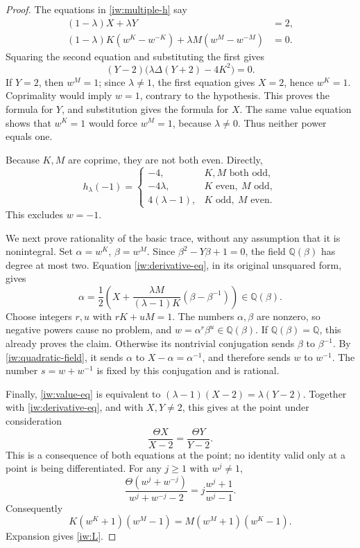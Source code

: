 \documentclass[11pt,a4paper]{article}
\theoremstyle{definition}
\theoremstyle{remark}
\begin{document}
\begin{proof}
The equations in \eqref{iw:multiple-h} say
\begin{align}
 (1-\lambda)X+\lambda Y&=2,\label{iw:value-eq}\\
 (1-\lambda)K(w^K-w^{-K})
   +\lambda M(w^M-w^{-M})&=0.\label{iw:derivative-eq}
\end{align}
Squaring the second equation and substituting the first gives
\[
 (Y-2)\bigl(\lambda\Delta(Y+2)-4K^2\bigr)=0.
 \tag{\(\ast\)}
\]
If \(Y=2\), then \(w^M=1\); since \(\lambda\ne1\), the first
equation gives \(X=2\), hence \(w^K=1\). Coprimality would imply
\(w=1\), contrary to the hypothesis. This proves the formula for
\(Y\), and substitution gives the formula for \(X\).
The same value equation shows that \(w^K=1\) would force
\(w^M=1\), because \(\lambda\ne0\). Thus neither power equals one.

Because \(K,M\) are coprime, they are not both even. Directly,
\[
 h_\lambda(-1)=
 \begin{cases}
  -4,&K,M\text{ both odd},\\
  -4\lambda,&K\text{ even},\ M\text{ odd},\\
  4(\lambda-1),&K\text{ odd},\ M\text{ even}.
 \end{cases}
\]
This excludes \(w=-1\).

We next prove rationality of the basic trace, without any
assumption that it is nonintegral. Set
\(\alpha=w^K\), \(\beta=w^M\). Since
\(\beta^2-Y\beta+1=0\), the field \(\mathbb Q(\beta)\) has degree
at most two. Equation \eqref{iw:derivative-eq}, in its original
unsquared form, gives
\begin{equation}\label{iw:quadratic-field}
 \alpha=\frac12\left(
 X+\frac{\lambda M}{(\lambda-1)K}
       (\beta-\beta^{-1})\right)\in\mathbb Q(\beta).
\end{equation}
Choose integers \(r,u\) with \(rK+uM=1\). The numbers \(\alpha,\beta\)
are nonzero, so negative powers cause no problem, and
\(w=\alpha^r\beta^u\in\mathbb Q(\beta)\).
If \(\mathbb Q(\beta)=\mathbb Q\), this already proves the claim.
Otherwise its nontrivial conjugation sends \(\beta\) to
\(\beta^{-1}\). By \eqref{iw:quadratic-field}, it sends \(\alpha\)
to \(X-\alpha=\alpha^{-1}\), and therefore sends \(w\) to \(w^{-1}\).
The number \(s=w+w^{-1}\) is fixed by this conjugation and is rational.

Finally, \eqref{iw:value-eq} is equivalent to
\((\lambda-1)(X-2)=\lambda(Y-2)\).
Together with \eqref{iw:derivative-eq}, and with \(X,Y\ne2\),
this gives at the point under consideration
\[
 \frac{\Theta X}{X-2}=\frac{\Theta Y}{Y-2}.
\]
This is a consequence of both equations at the point; no identity
valid only at a point is being differentiated. For any \(j\ge1\)
with \(w^j\ne1\),
\[
 \frac{\Theta(w^j+w^{-j})}{w^j+w^{-j}-2}
 =j\frac{w^j+1}{w^j-1}.
\]
Consequently
\[
 K(w^K+1)(w^M-1)=M(w^M+1)(w^K-1).
\]
Expansion gives \eqref{iw:L}.
\end{proof}
\end{document}
